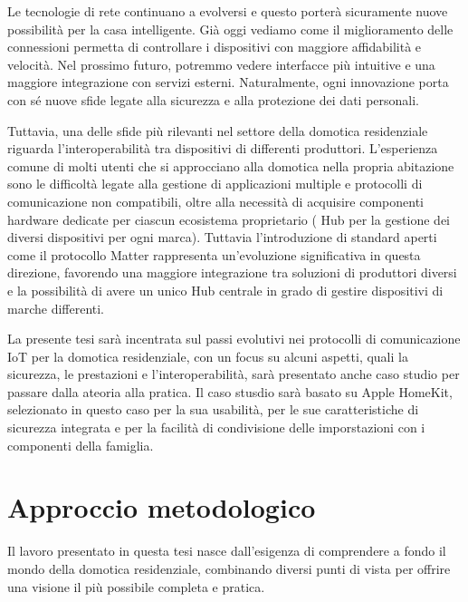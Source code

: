 \vspace{0.5cm}
Le tecnologie di rete continuano a evolversi e questo porterà sicuramente nuove possibilità per la casa intelligente. Già oggi vediamo come il miglioramento delle connessioni permetta di controllare i dispositivi con maggiore affidabilità e velocità. Nel prossimo futuro, potremmo vedere interfacce più intuitive e una maggiore integrazione con servizi esterni. Naturalmente, ogni innovazione porta con sé nuove sfide legate alla sicurezza e alla protezione dei dati personali.

\vspace{0.5cm}
Tuttavia, una delle sfide più rilevanti nel settore della domotica residenziale riguarda l'interoperabilità tra dispositivi di differenti produttori. L'esperienza comune di molti utenti che si approcciano alla domotica nella propria abitazione sono le difficoltà legate alla gestione di applicazioni multiple e protocolli di comunicazione non compatibili, oltre alla necessità di acquisire componenti hardware dedicate per ciascun ecosistema proprietario ( Hub per la gestione dei diversi dispositivi per ogni marca).  Tuttavia l'introduzione di standard aperti come il protocollo Matter rappresenta un'evoluzione significativa in questa direzione, favorendo una maggiore integrazione tra soluzioni di produttori diversi e la possibilità di avere un unico Hub centrale in grado di gestire dispositivi di marche differenti.

\vspace{0.5cm}
La presente tesi sarà incentrata sul passi evolutivi nei protocolli di comunicazione IoT per la domotica residenziale, con un focus su alcuni aspetti, quali la sicurezza, le prestazioni e l'interoperabilità, sarà presentato anche caso studio per passare dalla ateoria alla pratica. Il caso stusdio sarà basato su Apple HomeKit, selezionato in questo caso per la sua usabilità, per le sue caratteristiche di sicurezza integrata e per la facilità di condivisione delle imporstazioni con i componenti della famiglia.

\section{Approccio metodologico}
Il lavoro presentato in questa tesi nasce dall'esigenza di comprendere a fondo il mondo della domotica residenziale, combinando diversi punti di vista per offrire una visione il più possibile completa e pratica.

